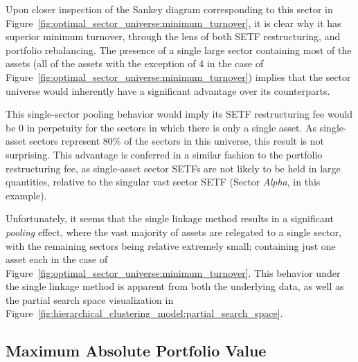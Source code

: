 \documentclass[../main.tex]{subfiles}
\begin{document}
Upon closer inspection of the Sankey diagram corresponding to this sector in Figure~\ref{fig:optimal_sector_universe:minimum_turnover}, it is clear why it has superior minimum turnover, through the lens of both SETF restructuring, and portfolio rebalancing. The presence of a single large sector containing most of the assets (all of the assets with the exception of 4 in the case of Figure~\ref{fig:optimal_sector_universe:minimum_turnover}) implies that the sector universe would inherently have a significant advantage over its counterparts.

This single-sector pooling behavior would imply its SETF restructuring fee would be 0 in perpetuity for the sectors in which there is only a single asset. As single-asset sectors represent 80\% of the sectors in this universe, this result is not surprising. This advantage is conferred in a similar fashion to the portfolio restructuring fee, as single-asset sector SETFs are not likely to be held in large quantities, relative to the singular vast sector SETF (Sector \textit{Alpha}, in this example).

Unfortunately, it seems that the single linkage method results in a significant \textit{pooling} effect, where the vast majority of assets are relegated to a single sector, with the remaining sectors being relative extremely small; containing just one asset each in the case of Figure~\ref{fig:optimal_sector_universe:minimum_turnover}. This behavior under the single linkage method is apparent from both the underlying data, as well as the partial search space visualization in Figure~\ref{fig:hierarchical_clustering_model:partial_search_space}.


\subsection{Maximum Absolute Portfolio Value}
\end{document}
